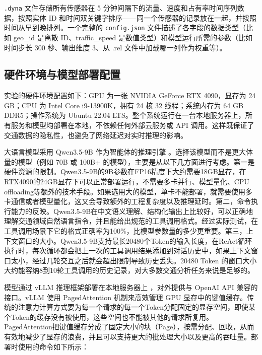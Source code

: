 \texttt{.dyna} 文件存储所有传感器在 5 分钟间隔下的流量、速度和占有率时间序列数据，按照实体 ID 和时间双关键字排序——同一个传感器的记录放在一起，并按照时间从早到晚排列。一个完整的 \texttt{config.json} 文件描述了各字段的数据类型（比如 geo\_id 是离散 ID、traffic\_speed 是数值类型）和模型运行所需的参数（比如时间步长 300 秒、输出维度 3、从 .rel 文件中加载哪一列作为权重等）。

\subsection{硬件环境与模型部署配置}

实验的硬件环境配置如下：GPU 为一张 NVIDIA GeForce RTX 4090，显存为 24 GB；CPU 为 Intel Core i9-13900K，拥有 24 核 32 线程；系统内存为 64 GB DDR5；操作系统为 Ubuntu 22.04 LTS。整个系统运行在一台本地服务器上，所有服务和模型均部署在本地，不依赖任何外部云服务或 API 调用。这样既保证了交通数据的隐私性，也避免了网络延迟对实时推理的影响。

大语言模型采用 Qwen3.5-9B 作为智能体的推理引擎 。选择该模型而不是更大体量的模型（例如 70B 或 100B+ 的模型），主要是从以下几方面进行考虑。第一是硬件资源的限制。Qwen3.5-9B的9B参数在FP16精度下大约需要18GB显存，在RTX4090的24GB显存下可以正常部署运行，不需要多卡并行、模型量化、CPU offloading等额外的技术手段。如果选用大的模型，单卡不能部署，就需要使用多卡通信或者模型量化，这又会导致额外的工程复杂度以及推理延时。第二，命令执行能力的反映。Qwen3.5-9B在中文语义理解、结构化输出上比较好，可以正确地理解交通领域自然语言指令，并且能给出规范的工具调用格式。经过实际测试，在工具调用场景下它的格式正确率为100\%，比模型参数量的多少更重要。第三，上下文窗口的大小。Qwen3.5-9B支持最长20480个Token的输入长度，在ReAct循环执行时，每次循环都会把上一次的工具调用结果添加到对话历史中，如果上下文窗口太小，经过几轮交互之后就会超出限制导致历史丢失。20480 Token 的窗口大小大约能容纳8到10轮工具调用的历史记录，对大多数交通分析任务来说是足够的。

模型通过 vLLM 推理框架部署在本地服务器上 ，对外提供与 OpenAI API 兼容的接口。vLLM 使用 PagedAttention 机制来高效管理 GPU 显存中的键值缓存。传统的注意力计算方式要为每一个请求的每一个Token分配固定的显存空间，即使某个Token的缓存没有被使用，这些空间也不能被其他的请求所复用。PagedAttention把键值缓存分成了固定大小的块（Page），按需分配、回收，从而有效地减少了显存的浪费，并且可以支持更大的批处理大小以及更高的吞吐量。部署时使用的命令如下所示：

